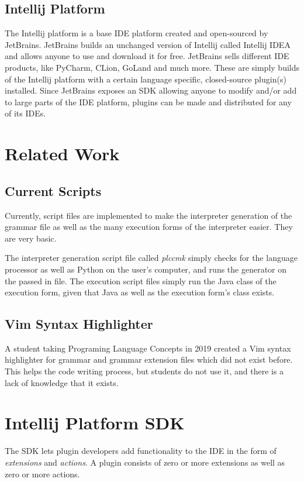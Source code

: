 \documentclass[conference, letterpaper]{IEEEtran}
\begin{document}
\subsection{Intellij Platform}\label{subsec:intellij-platform-sdk}
The Intellij platform is a base IDE platform created and open-sourced by JetBrains.
JetBrains builds an unchanged version of Intellij called Intellij IDEA and allows anyone to use and download it for free.
JetBrains sells different IDE products, like PyCharm, CLion, GoLand and much more.
These are simply builds of the Intellij platform with a certain language specific, closed-source plugin(s) installed.
Since JetBrains exposes an SDK allowing anyone to modify and/or add to large parts of the IDE platform, plugins can be made and distributed for any of its IDEs.


\section{Related Work}\label{sec:related-work}
\subsection{Current Scripts}\label{subsec:current-scripts}
Currently, script files are implemented to make the interpreter generation of the grammar file as well as the many execution forms of the interpreter easier.
They are very basic.

The interpreter generation script file called \textit{plccmk} simply checks for the language processor as well as Python on the user's computer, and runs the generator on the passed in file.
The execution script files simply run the Java class of the execution form, given that Java as well as the execution form's class exists.

\subsection{Vim Syntax Highlighter}\label{subsec:vim-highlighter-attempt}
A student taking Programing Language Concepts in 2019 created a Vim syntax highlighter for grammar and grammar extension files which did not exist before.
This helps the code writing process, but students do not use it, and there is a lack of knowledge that it exists.


\section{Intellij Platform SDK}\label{sec:intellij-platform-sdk}
The SDK lets plugin developers add functionality to the IDE in the form of \textit{extensions} and \textit{actions}.
A plugin consists of zero or more extensions as well as zero or more actions.
\end{document}
